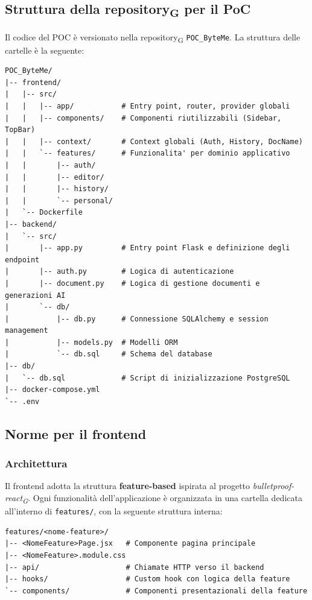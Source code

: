 \documentclass[11pt,a4paper]{article}
\newcommand{\gls}[1]{#1\textsubscript{G}}
\begin{document}
\subsection{Struttura della \gls{repository} per il PoC}
Il codice del POC è versionato nella \gls{repository} \texttt{POC\_ByteMe}. La struttura delle cartelle è la seguente:

\begin{verbatim}
POC_ByteMe/
|-- frontend/
|   |-- src/
|   |   |-- app/           # Entry point, router, provider globali
|   |   |-- components/    # Componenti riutilizzabili (Sidebar, TopBar)
|   |   |-- context/       # Context globali (Auth, History, DocName)
|   |   `-- features/      # Funzionalita' per dominio applicativo
|   |       |-- auth/
|   |       |-- editor/
|   |       |-- history/
|   |       `-- personal/
|   `-- Dockerfile
|-- backend/
|   `-- src/
|       |-- app.py         # Entry point Flask e definizione degli endpoint
|       |-- auth.py        # Logica di autenticazione
|       |-- document.py    # Logica di gestione documenti e generazioni AI
|       `-- db/
|           |-- db.py      # Connessione SQLAlchemy e session management
|           |-- models.py  # Modelli ORM
|           `-- db.sql     # Schema del database
|-- db/
|   `-- db.sql             # Script di inizializzazione PostgreSQL
|-- docker-compose.yml
`-- .env
\end{verbatim}
 

\subsection{Norme per il frontend}
\subsubsection{Architettura}
 
Il frontend adotta la struttura \textbf{feature-based} ispirata al progetto \textit{bulletproof-\gls{react}}. Ogni funzionalità dell'applicazione è organizzata in una cartella dedicata all'interno di \texttt{features/}, con la seguente struttura interna:
 
\begin{verbatim}
features/<nome-feature>/
|-- <NomeFeature>Page.jsx   # Componente pagina principale
|-- <NomeFeature>.module.css
|-- api/                    # Chiamate HTTP verso il backend
|-- hooks/                  # Custom hook con logica della feature
`-- components/             # Componenti presentazionali della feature
\end{verbatim}
 
\end{document}

